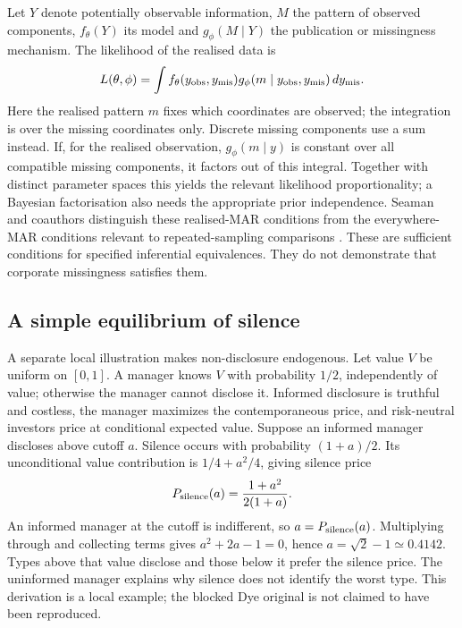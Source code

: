 \documentclass[11pt,a4paper]{article}
\begin{document}
Let $Y$ denote potentially observable information, $M$ the pattern of
observed components, $f_\theta(Y)$ its model and $g_\phi(M\mid Y)$ the
publication or missingness mechanism. The likelihood of the realised data is
\begin{equation}
L(\theta,\phi)=\int
f_\theta(y_{\rm obs},y_{\rm mis})
g_\phi(m\mid y_{\rm obs},y_{\rm mis})\,dy_{\rm mis}.
\end{equation}
Here the realised pattern $m$ fixes which coordinates are observed; the
integration is over the missing coordinates only. Discrete missing components
use a sum instead. If, for the realised observation, $g_\phi(m\mid y)$ is constant over
all compatible missing components, it factors out of this integral. Together
with distinct parameter spaces this yields the relevant likelihood
proportionality; a Bayesian factorisation also needs the appropriate prior
independence. Seaman and coauthors distinguish these realised-MAR conditions
from the everywhere-MAR conditions relevant to repeated-sampling comparisons
\cite[Theorems~1--3, Section~5.4 and Appendix]{seaman}. These are sufficient
conditions for specified inferential equivalences. They do not demonstrate
that corporate missingness satisfies them.

\subsection{A simple equilibrium of silence}
A separate local illustration makes non-disclosure endogenous. Let value $V$
be uniform on $[0,1]$. A manager knows $V$ with probability $1/2$, independently
of value; otherwise the manager cannot disclose it. Informed disclosure is
truthful and costless, the manager maximizes the contemporaneous price, and
risk-neutral investors price at conditional expected value. Suppose an informed
manager discloses above cutoff $a$. Silence occurs with probability
$(1+a)/2$. Its unconditional value contribution is
$1/4+a^2/4$, giving silence price
\begin{equation}
P_{\rm silence}(a)=\frac{1+a^2}{2(1+a)}.
\end{equation}
An informed manager at the cutoff is indifferent, so $a=P_{\rm silence}(a)$.
Multiplying through and collecting terms gives $a^2+2a-1=0$, hence
$a=\sqrt2-1\simeq0.4142$. Types above that value disclose and those below
it prefer the silence price. The uninformed manager explains why silence
does not identify the worst type. This derivation is a local example; the
blocked Dye original is not claimed to have been reproduced.
\end{document}
